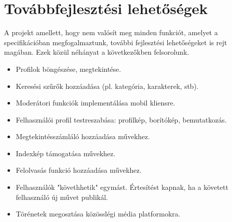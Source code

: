\section{Továbbfejlesztési lehetőségek}
\label{sec:improvements}
A projekt amellett, hogy nem valósít meg minden funkciót, amelyet a specifikációban megfogalmaztunk, további fejlesztési lehetőségeket is rejt magában. Ezek közül néhányat a következőkben felsorolunk.
\begin{itemize}
    \item Profilok böngészése, megtekintése.
    \item Keresési szűrők hozzáadása (pl. kategória, karakterek, stb).
    \item Moderátori funkciók implementálása mobil kliensre.
    \item Felhasználói profil testreszabása: profilkép, borítókép, bemutatkozás.
    \item Megtekintésszámláló hozzáadása művekhez.
    \item Indexkép támogatása művekhez.
    \item Felolvasás funkció hozzáadása művekhez.
    \item Felhasználók "követhhetik" egymást. Értesítést kapnak, ha a követett felhasználó új művet publikál.
    \item Törénetek megosztása közösslégi média platformokra.
\end{itemize}